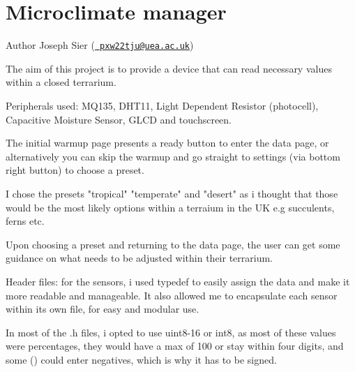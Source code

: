 \chapter{Microclimate manager}
\hypertarget{index}{}\label{index}
\begin{DoxyAuthor}{Author}
Joseph Sier (\href{mailto:pxw22tju@uea.ac.uk}{\texttt{ pxw22tju@uea.\+ac.\+uk}})
\end{DoxyAuthor}
The aim of this project is to provide a device that can read necessary values within a closed terrarium.

Peripherals used\+: MQ135, DHT11, Light Dependent Resistor (photocell), Capacitive Moisture Sensor, GLCD and touchscreen.

The initial warmup page presents a ready button to enter the data page, or alternatively you can skip the warmup and go straight to settings (via bottom right button) to choose a preset.

I chose the presets "{}tropical"{} "{}temperate"{} and "{}desert"{} as i thought that those would be the most likely options within a terraium in the UK e.\+g succulents, ferns etc.

Upon choosing a preset and returning to the data page, the user can get some guidance on what needs to be adjusted within their terrarium.

Header files\+: for the sensors, i used typedef to easily assign the data and make it more readable and manageable. It also allowed me to encapsulate each sensor within its own file, for easy and modular use.

In most of the .h files, i opted to use uint8-\/16 or int8, as most of these values were percentages, they would have a max of 100 or stay within four digits, and some () could enter negatives, which is why it has to be signed. 